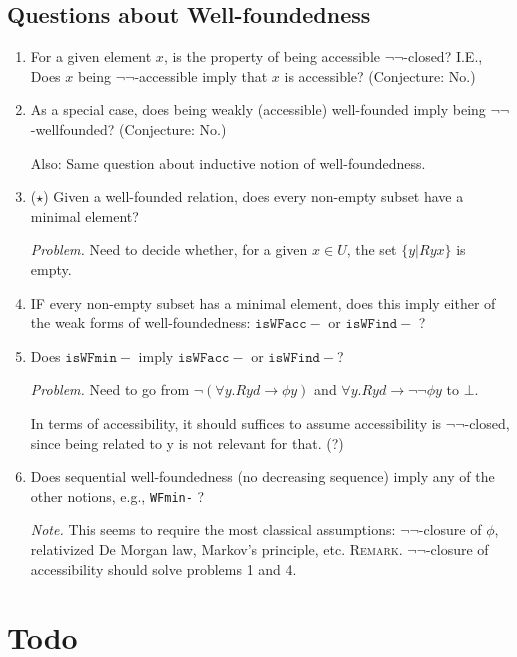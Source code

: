 \documentclass{scrartcl}
\begin{document}
  \subsection*{Questions about Well-foundedness}
  \begin{enumerate}
    \item For a given element $x$, is the property of
    being accessible $\lnot\lnot$-closed? I.E.,
    Does $x$ being $\lnot\lnot$-accessible imply that $x$ is accessible?
    (Conjecture: No.)

    \item As a special case, does being weakly (accessible) well-founded imply being $\lnot\lnot$-wellfounded?
    (Conjecture: No.)

    Also: Same question about inductive notion of well-foundedness.

    \item ($\star$) Given a well-founded relation, does every non-empty subset
    have a minimal element?

    \emph{Problem.} Need to decide whether, for a given $x \in U$,
     the set $\{y | Ryx\}$ is empty.

     \item IF every non-empty subset has a minimal element, does this imply
     either of the weak forms of well-foundedness: $\mathtt{isWFacc-}$ or
     $\mathtt{isWFind-}$ ?

     \item Does $\mathtt{isWFmin-}$ imply $\mathtt{isWFacc-}$ or $\mathtt{isWFind-}$?

     \emph{Problem.} Need to go from $\lnot (\forall y. R y d \to \phi y)$
     and $\forall y. R y d \to \lnot \lnot \phi y$ to $\bot$.

     In terms of accessibility, it should suffices to assume accessibility is
     $\lnot\lnot$-closed, since being related to y is not relevant for that. (?)

     \item Does sequential well-foundedness (no decreasing sequence) imply
     any of the other notions, e.g., \texttt{WFmin-} ?

     \emph{Note.}  This seems to require the most classical assumptions:
     $\lnot\lnot$-closure of $\phi$, relativized De Morgan law,
     Markov's principle, etc.
     \textsc{Remark.}
     $\lnot\lnot$-closure of accessibility should solve problems 1 and 4.
  \end{enumerate}
  \newpage

\section{Todo}
\end{document}
